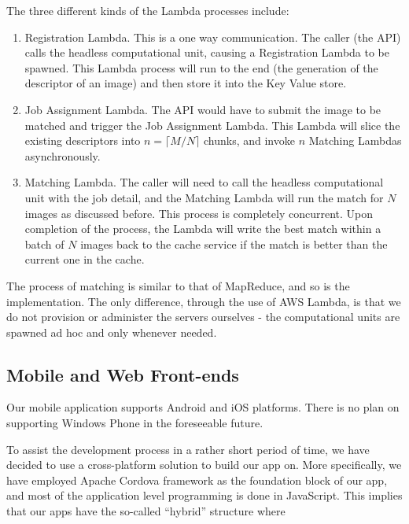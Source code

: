 The three different kinds of the Lambda processes include:

\begin{enumerate}
	\item Registration Lambda. This is a one way communication. The caller (the API) calls the headless computational unit, causing a Registration Lambda to be spawned. This Lambda process will run to the end (the generation of the descriptor of an image) and then store it into the Key Value store.
	\item Job Assignment Lambda. The API would have to submit the image to be matched and trigger the Job Assignment Lambda. This Lambda will slice the existing descriptors into $n=\lceil M / N \rceil$ chunks, and invoke $n$ Matching Lambdas asynchronously.
	\item Matching Lambda. The caller will need to call the headless computational unit with the job detail, and the Matching Lambda will run the match for $N$ images as discussed before. This process is completely concurrent. Upon completion of the process, the Lambda will write the best match within a batch of $N$ images back to the cache service if the match is better than the current one in the cache.
\end{enumerate}

The process of matching is similar to that of MapReduce, and so is the implementation. The only difference, through the use of AWS Lambda, is that we do not provision or administer the servers ourselves - the computational units are spawned ad hoc and only whenever needed.


\subsection{Mobile and Web Front-ends}
Our mobile application supports Android and iOS platforms. There is no plan on supporting Windows Phone in the foreseeable future.

To assist the development process in a rather short period of time, we have decided to use a cross-platform solution to build our app on. More specifically, we have employed Apache Cordova \cite{cordova} framework as the foundation block of our app, and most of the application level programming is done in JavaScript. This implies that our apps have the so-called ``hybrid'' structure where


